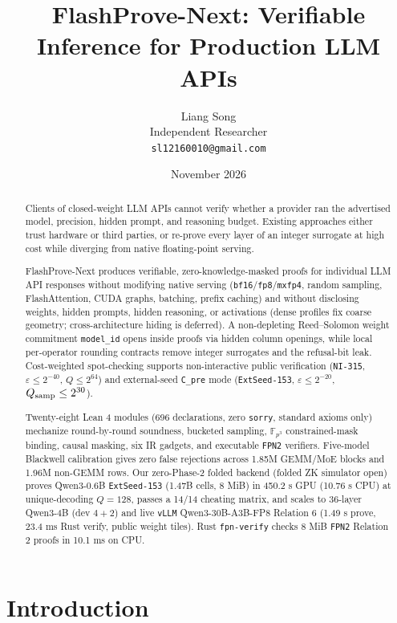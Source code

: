 \documentclass[10pt]{article}
\title{FlashProve-Next: Verifiable Inference for Production LLM APIs}
\author{Liang Song\\
\small Independent Researcher\\
\small \texttt{sl12160010@gmail.com}}
\date{November 2026}
\begin{document}
\maketitle
\begin{abstract}
Clients of closed-weight LLM APIs cannot verify whether a provider ran the advertised model, precision, hidden prompt, and reasoning budget. Existing approaches either trust hardware or third parties, or re-prove every layer of an integer surrogate at high cost while diverging from native floating-point serving.

FlashProve-Next produces verifiable, zero-knowledge-masked proofs for individual LLM API responses without modifying native serving (\texttt{bf16}/\texttt{fp8}/\texttt{mxfp4}, random sampling, FlashAttention, CUDA graphs, batching, prefix caching) and without disclosing weights, hidden prompts, hidden reasoning, or activations (dense profiles fix coarse geometry; cross-architecture hiding is deferred). A non-depleting Reed--Solomon weight commitment \texttt{model\_\allowbreak{}id} opens inside proofs via hidden column openings, while local per-operator rounding contracts remove integer surrogates and the refusal-bit leak. Cost-weighted spot-checking supports non-interactive public verification (\texttt{NI-315}, $\varepsilon \le 2^{-40}$, $Q \le 2^{64}$) and external-seed \texttt{C\_\allowbreak{}pre} mode (\texttt{ExtSeed-153}, $\varepsilon \le 2^{-20}$, $Q_{\rm samp}\le 2^{30}$).

Twenty-eight Lean 4 modules (696 declarations, zero \texttt{sorry}, standard axioms only) mechanize round-by-round soundness, bucketed sampling, $\mathbb F_{p^3}$ constrained-mask binding, causal masking, six IR gadgets, and executable \texttt{FPN2} verifiers. Five-model Blackwell calibration gives zero false rejections across 1.85M GEMM/MoE blocks and 1.96M non-GEMM rows. Our zero-Phase-2 folded backend (folded ZK simulator open) proves Qwen3-0.6B \texttt{ExtSeed-153} (1.47B cells, 8 MiB) in 450.2 s GPU (10.76 s CPU) at unique-decoding $Q=128$, passes a 14/14 cheating matrix, and scales to 36-layer Qwen3-4B (dev $4+2$) and live \texttt{vLLM} Qwen3-30B-A3B-FP8 Relation 6 (1.49 s prove, 23.4 ms Rust verify, public weight tiles). Rust \texttt{fpn-verify} checks 8 MiB \texttt{FPN2} Relation 2 proofs in 10.1 ms on CPU.

\end{abstract}
\section{Introduction}
\end{document}
